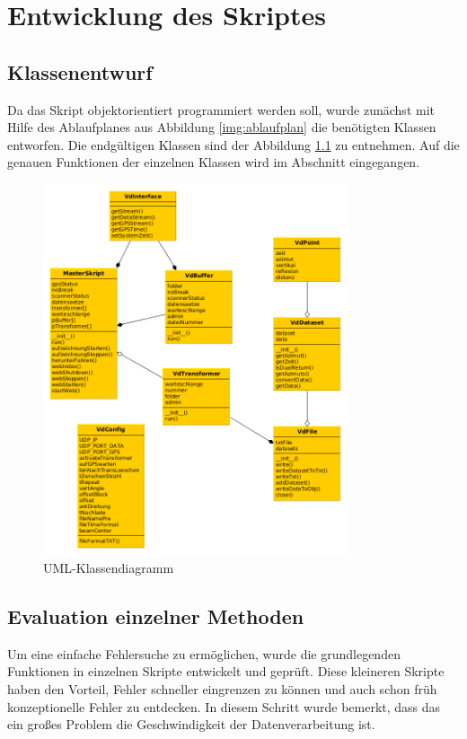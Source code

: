\documentclass[a4paper,12pt,bibliography=totoc, listof=totoc,titlepage]{scrreprt}
\begin{document}
\chapter{Entwicklung des Skriptes}
\label{chapterSkript}

\section{Klassenentwurf}
Da das Skript objektorientiert programmiert werden soll, wurde zunächst mit Hilfe des Ablaufplanes aus Abbildung \ref{img:ablaufplan} die benötigten Klassen entworfen. Die endgültigen Klassen sind der Abbildung \ref{img:uml} zu entnehmen. Auf die genauen Funktionen der einzelnen Klassen wird im Abschnitt  eingegangen.

\begin{figure}[ht!]
 \centering
 \includegraphics[width=0.8\textwidth]{./img/UML.png}
 \caption{UML-Klassendiagramm}
 \label{img:uml}
\end{figure}

\section{Evaluation einzelner Methoden}
Um eine einfache Fehlersuche zu ermöglichen, wurde die grundlegenden Funktionen in einzelnen Skripte entwickelt und geprüft. Diese kleineren Skripte haben den Vorteil, Fehler schneller eingrenzen zu können und auch schon früh konzeptionelle Fehler zu entdecken. In diesem Schritt wurde bemerkt, dass das ein großes Problem die Geschwindigkeit der Datenverarbeitung ist. 
\end{document}
